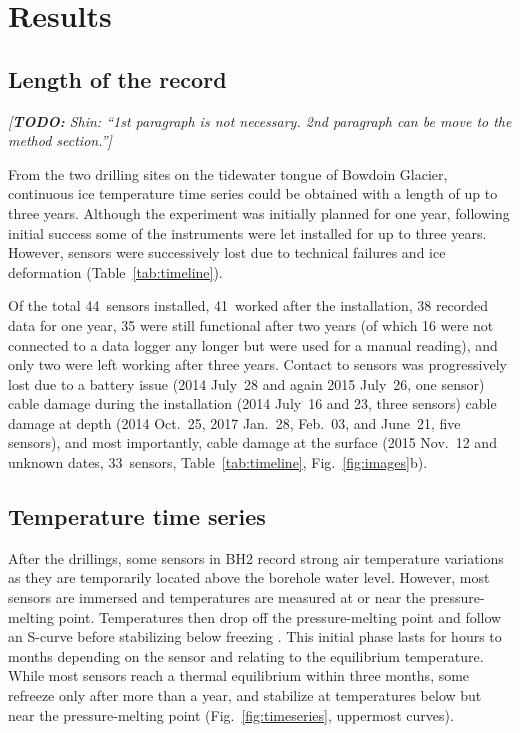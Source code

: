 \documentclass[utf8]{article}
\newcommand{\todo}[1]{\textcolor{c3}{\emph{[\textbf{TODO:} #1]}}}
\begin{document}
\section{Results}

\subsection{Length of the record}

    \todo{Shin: ``1st paragraph is not necessary. 2nd paragraph can be move to
          the method section.''}

    From the two drilling sites on the tidewater tongue of Bowdoin Glacier,
    continuous ice temperature time series could be obtained with a length of
    up to three years. Although the experiment was initially planned for one
    year, following initial success some of the instruments were let installed
    for up to three years. However, sensors were successively lost due to
    technical failures and ice deformation (Table~\ref{tab:timeline}).

    Of the total 44~sensors installed, 41~worked after the installation, 38
    recorded data for one year, 35 were still functional after two years (of
    which 16 were not connected to a data logger any longer but were used for a
    manual reading), and only two were left
    working after three years. Contact to sensors was progressively lost due to a
    battery issue (2014 July~28 and again 2015 July~26, one sensor) cable
    damage during the installation (2014 July~16 and 23, three sensors) cable
    damage at depth (2014 Oct.~25, 2017 Jan.~28, Feb.~03, and June~21, five
    sensors), and most importantly, cable damage at the surface (2015 Nov.~12
    and unknown dates, 33~sensors, Table~\ref{tab:timeline},
    Fig.~\ref{fig:images}b).


\subsection{Temperature time series}

    After the drillings, some sensors in BH2 record strong air temperature
    variations as they are temporarily located above the borehole water level.
    However, most sensors are immersed and temperatures are measured at or near
    the pressure-melting point. Temperatures
    then drop off the pressure-melting point and follow an S-curve before
    stabilizing below freezing \citep[cf.][Fig.~3.6]{Ryser.2014}. This initial
    phase lasts for hours to months
    depending on the sensor and relating to the equilibrium temperature. While
    most sensors reach a thermal equilibrium within three months, some refreeze
    only after more than a year, and stabilize at temperatures below but near
    the pressure-melting point (Fig.~\ref{fig:timeseries}, uppermost curves).
\end{document}
